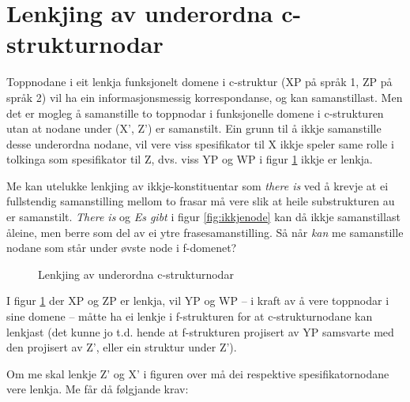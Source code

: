 \documentclass[11pt,a4paper,oneside,draft]{book}
\begin{document}
\section{Lenkjing av underordna c-strukturnodar}
\label{sec-3.9}

\label{SEC:subnode}

Toppnodane i eit lenkja funksjonelt domene i c-struktur (XP på språk
1, ZP på språk 2) vil ha ein informasjonsmessig korrespondanse, og kan
samanstillast. Men det er mogleg å samanstille to toppnodar i
funksjonelle domene i c-strukturen utan at nodane under (X', Z') er
samanstilt. Ein grunn til å ikkje samanstille desse underordna nodane,
vil vere viss spesifikator til X ikkje speler same rolle i tolkinga
som spesifikator til Z, dvs. viss YP og WP i figur \ref{fig:subnode}
ikkje er lenkja.


Me kan utelukke lenkjing av ikkje-konstituentar som \emph{there is} ved å
krevje at ei fullstendig samanstilling mellom to frasar må vere slik
at heile substrukturen au er samanstilt. \emph{There is} og \emph{Es gibt} i
figur \ref{fig:ikkjenode} kan då ikkje samanstillast åleine, men berre
som del av ei ytre frasesamanstilling.
Så når \emph{kan} me samanstille nodane som står under øvste node i
f-domenet?

\begin{figure}[htp]
   \vfill{} %
   \caption{Lenkjing av underordna c-strukturnodar}
   \label{fig:subnode}
  \end{figure}

I figur \ref{fig:subnode} der XP og ZP er lenkja, vil YP og WP -- i
kraft av å vere toppnodar i sine domene -- måtte ha ei lenkje i
f-strukturen for at c-strukturnodane kan lenkjast (det kunne jo
t.d. hende at f-strukturen projisert av YP samsvarte med den projisert
av Z', eller ein struktur under Z').

Om me skal lenkje Z' og X' i figuren over må dei respektive
spesifikatornodane vere lenkja. Me får då følgjande krav:
\end{document}
